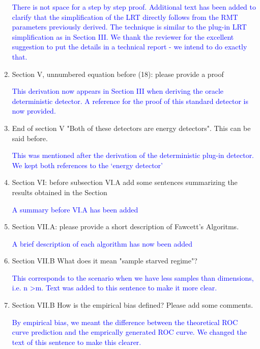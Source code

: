 \documentclass[11pt]{article}
\begin{document}
\begin{enumerate}
  \textcolor{blue}{There is not space for a step by step proof. Additional text has been added to clarify that the simplification of the LRT directly follows from the RMT parameters previously derived. The technique is similar to the plug-in LRT simplification as in Section III. We thank the reviewer for the excellent suggestion to put the details in a technical report - we intend to do exactly that.}

\item Section V, unnumbered equation before (18): please provide a proof

  \textcolor{blue}{This derivation now appears in Section III when deriving the oracle deterministic detector. A reference for the proof of this standard detector is now provided.}

\item End of section V "Both of these detectors are energy detectors". This can be said before.

\textcolor{blue}{This was mentioned after the derivation of the deterministic plug-in detector. We kept both references to the `energy detector'}

\item Section VI: before subsection VI.A add some sentences summarizing the results obtained in the Section

\textcolor{blue}{A summary before VI.A has been added}

\item Section VII.A: please provide a short description of Fawcett's Algoritms.

\textcolor{blue}{A brief description of each algorithm has now been added}

\item Section VII.B What does it mean "sample starved regime"?

\textcolor{blue}{This corresponds to the scenario when we have less samples than dimensions, i.e. n >m. Text was added to this sentence to make it more clear.}

\item Section VII.B How is the empirical bias defined? Please add some comments.

\textcolor{blue}{By empirical bias, we meant the difference between the theoretical ROC curve prediction and the emprically generated ROC curve. We changed the text of this sentence to make this clearer.}

\end{enumerate}
\end{document}

